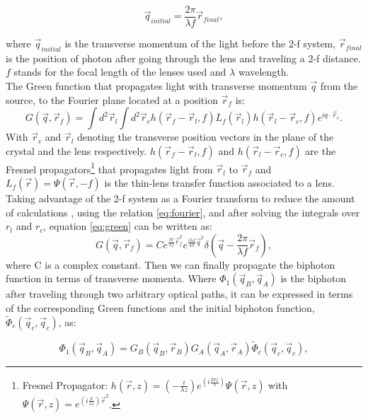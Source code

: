 \begin{equation}\label{eq:fourier}
\vec{q}_{initial}=\frac{2 \pi}{\lambda f} \vec{r}_{final},
\end{equation}



where $\vec{q}_{initial}$ is the transverse momentum of the light before the 2-f system, $\vec{r}_{final}$ is the position of photon
after going through the lens and traveling a 2-f distance. $f$ stands for the focal length of the lenses used and $\lambda$ wavelength.\\
The Green function that propagates light with transverse momentum $\vec{q}$ from the source, to the
Fourier plane located at a position $\vec{r}_f$ is\cite{green}:
\begin{equation}\label{eq:green}
G(\vec{q},\vec{r}_f) = \int d^2 \vec{r}_l \int d^2 \vec{r}_c h(\vec{r}_f - \vec{r}_l,f) L_f(\vec{r}_l) h(\vec{r}_l - \vec{r}_c,f) e^{i q \cdot \vec{r}_c}.
\end{equation}
With $\vec{r}_c$ and $\vec{r}_l$ denoting the transverse position vectors in the plane of the crystal and the 
lens respectively. $h(\vec{r}_f - \vec{r}_l,f)$ and $h(\vec{r}_l - \vec{r}_c,f)$ are the Fresnel propagators\footnote{Fresnel Propagator: $h(\vec{r},z)=(- \frac{i}{\lambda z})e^{(i \frac{2 \pi z}{\lambda})} \Psi (\vec{r},z)$ 
with $\Psi(\vec{r},z) = e^{(i \frac{\pi}{\lambda z })\vec{r}^2}$. } that propagates light from $\vec{r}_l$ to $\vec{r}_f$ and 
$L_f (\vec{r})=\Psi(\vec{r},-f)$ is the thin-lens transfer function associated to a lens\cite{green}.
 \\
Taking advantage of the 2-f system as a Fourier transform to reduce the amount of calculations
, using the relation \ref{eq:fourier}, and after solving the integrals over $r_l$ and $r_c$, equation
 \ref{eq:green} can be written as:
\begin{equation}
\label{eq:greenSolve}
G(\vec{q},\vec{r}_f)=C e^{\frac{i \pi}{\lambda f} \vec{r}_f^2} e^{\frac{i \lambda f}{4 \pi} \vec{q}^2} \delta ( \vec{q} - \frac{2 \pi}{\lambda f}\vec{r}_f),
\end{equation}
where C is a complex constant.
Then we can finally propagate  the biphoton function
in terms of transverse momenta. Where $\Phi_1 (\vec{q}_B , \vec{q}_A )$ is the biphoton after traveling
through two arbitrary optical paths, it can be expressed
in terms of the corresponding Green functions and the
initial biphoton function, $\tilde{\Phi}_c(\vec{q}_c,\vec{q}_c)$, as:

\begin{equation}\label{eq:final}
\Phi_1 (\vec{q}_B , \vec{q}_A )= G_B(\vec{q}_B,\vec{r}_B) G_A(\vec{q}_A,\vec{r}_A) \tilde{\Phi}_c(\vec{q}_c,\vec{q}_c),
\end{equation}





